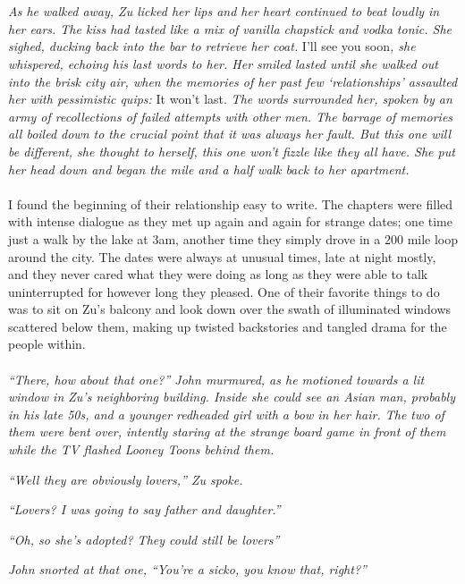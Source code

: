 \documentclass[12pt,oneside,openany]{memoir}
\begin{document}
\\\\	
\indent\textit{As he walked away, Zu licked her lips and her heart continued to beat loudly in her ears. The kiss had tasted like a mix of vanilla chapstick and vodka tonic. She sighed, ducking back into the bar to retrieve her coat.} I’ll see you soon\textit{, she whispered, echoing his last words to her. Her smiled lasted until she walked out into the brisk city air, when the memories of her past few ‘relationships’ assaulted her with pessimistic quips:} It won’t last. \textit{The words surrounded her, spoken by an army of recollections of failed attempts with other men. The barrage of memories all boiled down to the crucial point that it was always her fault. But this one will be different, she thought to herself, this one won’t fizzle like they all have. She put her head down and began the mile and a half walk back to her apartment.} 
\\\\
\indent I found the beginning of their relationship easy to write. The chapters were filled with intense dialogue as they met up again and again for strange dates; one time just a walk by the lake at 3am, another time they simply drove in a 200 mile loop around the city. The dates were always at unusual times, late at night mostly, and they never cared what they were doing as long as they were able to talk uninterrupted for however long they pleased. One of their favorite things to do was to sit on Zu’s balcony and look down over the swath of illuminated windows scattered below them, making up twisted backstories and tangled drama for the people within.
\\\\	
\indent\textit{“There, how about that one?” John murmured, as he motioned towards a lit window in Zu’s neighboring building. Inside she could see an Asian man, probably in his late 50s, and a younger redheaded girl with a bow in her hair. The two of them were bent over, intently staring at the strange board game in front of them while the TV flashed Looney Toons behind them.}
	
\textit{“Well they are obviously lovers,” Zu spoke. }
	
\textit{	“Lovers? I was going to say father and daughter.”}
	
\textit{	“Oh, so she’s adopted? They could still be lovers”}
	
\textit{	John snorted at that one, “You’re a sicko, you know that, right?”}
	
\end{document}
